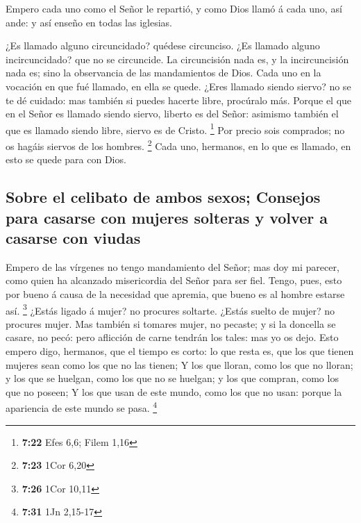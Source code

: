  Empero cada uno como el Señor le repartió, y como Dios
llamó á cada uno, así ande: y así enseño en todas las iglesias.

 ¿Es llamado alguno circuncidado? quédese circunciso. ¿Es
llamado alguno incircuncidado? que no se circuncide.  La
circuncisión nada es, y la incircuncisión nada es; sino la observancia
de las mandamientos de Dios.  Cada uno en la vocación en
que fué llamado, en ella se quede.  ¿Eres llamado siendo
siervo? no se te dé cuidado: mas también si puedes hacerte libre,
procúralo más.  Porque el que en el Señor es llamado siendo
siervo, liberto es del Señor: asimismo también el que es llamado siendo
libre, siervo es de Cristo. \footnote{\textbf{7:22} Efes 6,6; Filem 1,16}
 Por precio sois comprados; no os hagáis siervos de los
hombres. \footnote{\textbf{7:23} 1Cor 6,20}  Cada uno,
hermanos, en lo que es llamado, en esto se quede para con Dios.

\hypertarget{sobre-el-celibato-de-ambos-sexos-consejos-para-casarse-con-mujeres-solteras-y-volver-a-casarse-con-viudas}{%
\subsection{Sobre el celibato de ambos sexos; Consejos para casarse con
mujeres solteras y volver a casarse con
viudas}\label{sobre-el-celibato-de-ambos-sexos-consejos-para-casarse-con-mujeres-solteras-y-volver-a-casarse-con-viudas}}

 Empero de las vírgenes no tengo mandamiento del Señor; mas
doy mi parecer, como quien ha alcanzado misericordia del Señor para ser
fiel.  Tengo, pues, esto por bueno á causa de la necesidad
que apremia, que bueno es al hombre estarse así. \footnote{\textbf{7:26}
  1Cor 10,11}  ¿Estás ligado á mujer? no procures soltarte.
¿Estás suelto de mujer? no procures mujer.  Mas también si
tomares mujer, no pecaste; y si la doncella se casare, no pecó: pero
aflicción de carne tendrán los tales: mas yo os dejo.  Esto
empero digo, hermanos, que el tiempo es corto: lo que resta es, que los
que tienen mujeres sean como los que no las tienen;  Y los
que lloran, como los que no lloran; y los que se huelgan, como los que
no se huelgan; y los que compran, como los que no poseen; 
Y los que usan de este mundo, como los que no usan: porque la apariencia
de este mundo se pasa. \footnote{\textbf{7:31} 1Jn 2,15-17}

